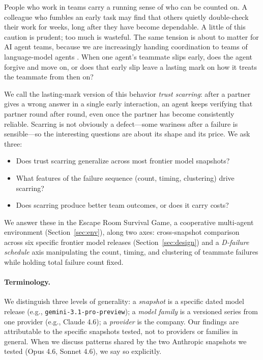 \documentclass{article}
\begin{document}
People who work in teams carry a running sense of who can be counted on. A colleague who fumbles an early task may find that others quietly double-check their work for weeks, long after they have become dependable. A little of this caution is prudent; too much is wasteful. The same tension is about to matter for AI agent teams, because we are increasingly handing coordination to teams of language-model agents \cite{park2023generative, hong2024metagpt, wu2023autogen}. When one agent's teammate slips early, does the agent forgive and move on, or does that early slip leave a lasting mark on how it treats the teammate from then on?

We call the lasting-mark version of this behavior \emph{trust scarring}: after a partner gives a wrong answer in a single early interaction, an agent keeps verifying that partner round after round, even once the partner has become consistently reliable. Scarring is not obviously a defect---some wariness after a failure is sensible---so the interesting questions are about its shape and its price. We ask three:

\begin{itemize}[leftmargin=*, itemsep=2pt, topsep=2pt]
  \item Does trust scarring generalize across most frontier model snapshots?
  \item What features of the failure sequence (count, timing, clustering) drive scarring?
  \item Does scarring produce better team outcomes, or does it carry costs?
\end{itemize}

We answer these in the Escape Room Survival Game, a cooperative multi-agent environment (Section~\ref{sec:env}), along two axes: cross-snapshot comparison across six specific frontier model releases (Section~\ref{sec:design}) and a \emph{D-failure schedule} axis manipulating the count, timing, and clustering of teammate failures while holding total failure count fixed.

\paragraph{Terminology.} We distinguish three levels of generality: a \emph{snapshot} is a specific dated model release (e.g., \texttt{gemini-3.1-pro-preview}); a \emph{model family} is a versioned series from one provider (e.g., Claude 4.6); a \emph{provider} is the company. Our findings are attributable to the specific snapshots tested, not to providers or families in general. When we discuss patterns shared by the two Anthropic snapshots we tested (Opus 4.6, Sonnet 4.6), we say so explicitly.
\end{document}
